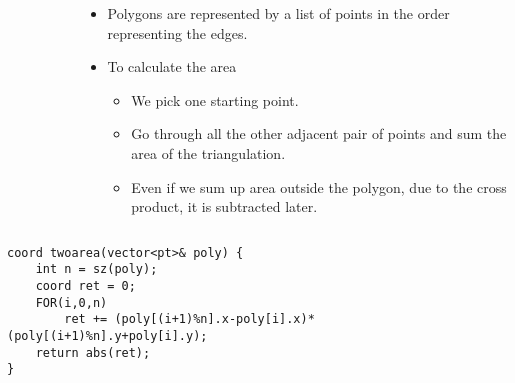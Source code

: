 \documentclass[12pt,t]{beamer}
\newcommand{\bi}{\begin{itemize}}
\newcommand{\ei}{\end{itemize}}
\begin{document}
\begin{frame}
\begin{columns}
\begin{column}{0.4\textwidth}
\begin{figure}
      \end{figure}
    \end{column}
    \begin{column}{0.6\textwidth}
      \bi
        \item Polygons are represented by a list of points in the order
          representing the edges.
        \item To calculate the area
          \bi
            \item We pick one starting point.
            \item Go through all the other adjacent pair of points and sum the
              area of the triangulation.
            \item Even if we sum up area outside the polygon, due to the cross
              product, it is subtracted later.
          \ei
      \ei
    \end{column}
  \end{columns}
\end{frame}

\begin{frame}[fragile]
  \vspace{20pt}
  \footnotesize
  \begin{verbatim}
coord twoarea(vector<pt>& poly) {
    int n = sz(poly);
    coord ret = 0;
    FOR(i,0,n)
        ret += (poly[(i+1)%n].x-poly[i].x)*(poly[(i+1)%n].y+poly[i].y);
    return abs(ret);
}
  \end{verbatim}
\end{frame}
\end{document}
